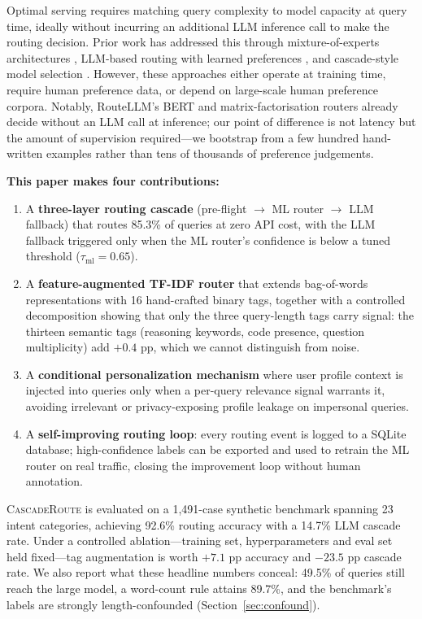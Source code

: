 \documentclass{article}
\newcommand{\system}{\textsc{CascadeRoute}}
\begin{document}
Optimal serving requires matching query complexity to model capacity at
query time, ideally without incurring an additional LLM inference
call to make the routing decision. Prior work has addressed this through
mixture-of-experts architectures \citep{shazeer2017moe,jiang2024mixtral},
LLM-based routing with learned preferences \citep{ong2024routellm}, and
cascade-style model selection \citep{chen2023frugalgpt}. However, these
approaches either operate at training time, require human preference data,
or depend on large-scale human preference corpora. Notably, RouteLLM's
BERT and matrix-factorisation routers already decide without an LLM call at
inference; our point of difference is not latency but the amount of
supervision required---we bootstrap from a few hundred hand-written examples
rather than tens of thousands of preference judgements.

\textbf{This paper makes four contributions:}
\begin{enumerate}
    \item A \textbf{three-layer routing cascade} (pre-flight $\rightarrow$
          ML router $\rightarrow$ LLM fallback) that routes 85.3\% of
          queries at zero API cost, with the LLM fallback triggered only
          when the ML router's confidence is below a tuned threshold
          ($\tau_\text{ml} = 0.65$).
    \item A \textbf{feature-augmented TF-IDF router} that extends
          bag-of-words representations with 16 hand-crafted binary tags,
          together with a controlled decomposition showing that only the
          three query-length tags carry signal: the thirteen semantic tags
          (reasoning keywords, code presence, question multiplicity) add
          $+0.4$ pp, which we cannot distinguish from noise.
    \item A \textbf{conditional personalization mechanism} where user
          profile context is injected into queries only when a per-query
          relevance signal warrants it, avoiding irrelevant or
          privacy-exposing profile leakage on impersonal queries.
    \item A \textbf{self-improving routing loop}: every routing event is
          logged to a SQLite database; high-confidence labels can be
          exported and used to retrain the ML router on real traffic,
          closing the improvement loop without human annotation.
\end{enumerate}

\system{} is evaluated on a 1,491-case synthetic benchmark spanning 23
intent categories, achieving 92.6\% routing accuracy with a 14.7\% LLM
cascade rate. Under a controlled ablation---training set, hyperparameters and
eval set held fixed---tag augmentation is worth $+7.1$ pp accuracy and
$-23.5$ pp cascade rate. We also report what these headline numbers conceal:
49.5\% of queries still reach the large model, a word-count rule attains
89.7\%, and the benchmark's labels are strongly length-confounded
(Section~\ref{sec:confound}).
\end{document}
